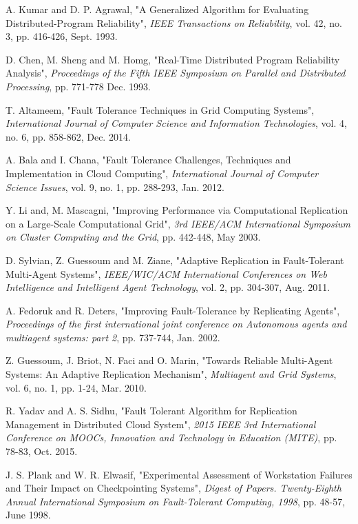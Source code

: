 \documentclass{cslthse-msc}
\begin{document}
\begin{thebibliography}{50}
	A. Kumar and D. P. Agrawal,
	"A Generalized Algorithm for Evaluating Distributed-Program Reliability",
	\emph{IEEE Transactions on Reliability}, vol. 42, no. 3, pp. 416-426, Sept. 1993.

	D. Chen, M. Sheng and M. Homg,
	"Real-Time Distributed Program Reliability Analysis",
	\emph{Proceedings of the Fifth IEEE Symposium on Parallel and Distributed Processing}, pp. 771-778 Dec. 1993.

	T. Altameem,
	"Fault Tolerance Techniques in Grid Computing Systems",
	\emph{International Journal of Computer Science and Information Technologies}, vol. 4, no. 6, pp. 858-862, Dec. 2014.

	A. Bala and I. Chana,
	"Fault Tolerance Challenges, Techniques and Implementation in Cloud Computing",
	\emph{International Journal of Computer Science Issues}, vol. 9, no. 1, pp. 288-293, Jan. 2012.

	Y. Li and, M. Mascagni,
	"Improving Performance via Computational Replication on a Large-Scale Computational Grid",
	\emph{3rd IEEE/ACM International Symposium on Cluster Computing and the Grid}, pp. 442-448, May 2003.

	D. Sylvian, Z. Guessoum and M. Ziane,
	"Adaptive Replication in Fault-Tolerant Multi-Agent Systems",
	\emph{IEEE/WIC/ACM International Conferences on Web Intelligence and Intelligent Agent Technology}, vol. 2, pp. 304-307, Aug. 2011.

	A. Fedoruk and R. Deters,
	"Improving Fault-Tolerance by Replicating Agents",
	\emph{Proceedings of the first international joint conference on Autonomous agents and multiagent systems: part 2}, pp. 737-744, Jan. 2002.

	Z. Guessoum, J. Briot, N. Faci and O. Marin,
	"Towards Reliable Multi-Agent Systems: An Adaptive Replication Mechanism",
	\emph{ Multiagent and Grid Systems}, vol. 6, no. 1, pp. 1-24, Mar. 2010.

	R. Yadav and A. S. Sidhu,
	"Fault Tolerant Algorithm for Replication Management in Distributed Cloud System",
	\emph{2015 IEEE 3rd International Conference on MOOCs, Innovation and Technology in Education (MITE)}, pp. 78-83, Oct. 2015.

	J. S. Plank and W. R. Elwasif,
	"Experimental Assessment of Workstation Failures and Their Impact on Checkpointing Systems",
	\emph{Digest of Papers. Twenty-Eighth Annual International Symposium on Fault-Tolerant Computing, 1998}, pp. 48-57, June 1998.


\end{thebibliography}
\end{document}
